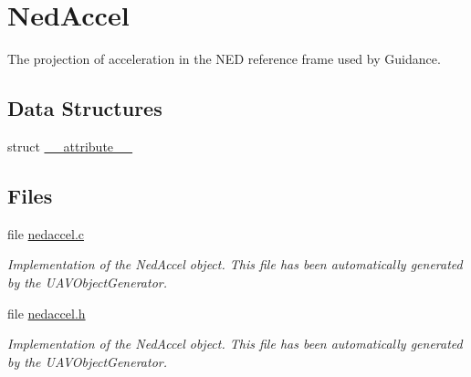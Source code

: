 \hypertarget{group___ned_accel}{\section{\-Ned\-Accel}
\label{group___ned_accel}
}


\-The projection of acceleration in the \-N\-E\-D reference frame used by \-Guidance.  


\subsection*{\-Data \-Structures}
\begin{DoxyCompactItemize}
\item 
struct \hyperlink{struct____attribute____}{\-\_\-\-\_\-attribute\-\_\-\-\_\-}
\end{DoxyCompactItemize}
\subsection*{\-Files}
\begin{DoxyCompactItemize}
\item 
file \hyperlink{nedaccel_8c}{nedaccel.\-c}
\begin{DoxyCompactList}\small\item\em \-Implementation of the \-Ned\-Accel object. \-This file has been automatically generated by the \-U\-A\-V\-Object\-Generator. \end{DoxyCompactList}\item 
file \hyperlink{nedaccel_8h}{nedaccel.\-h}
\begin{DoxyCompactList}\small\item\em \-Implementation of the \-Ned\-Accel object. \-This file has been automatically generated by the \-U\-A\-V\-Object\-Generator. \end{DoxyCompactList}\end{DoxyCompactItemize}
